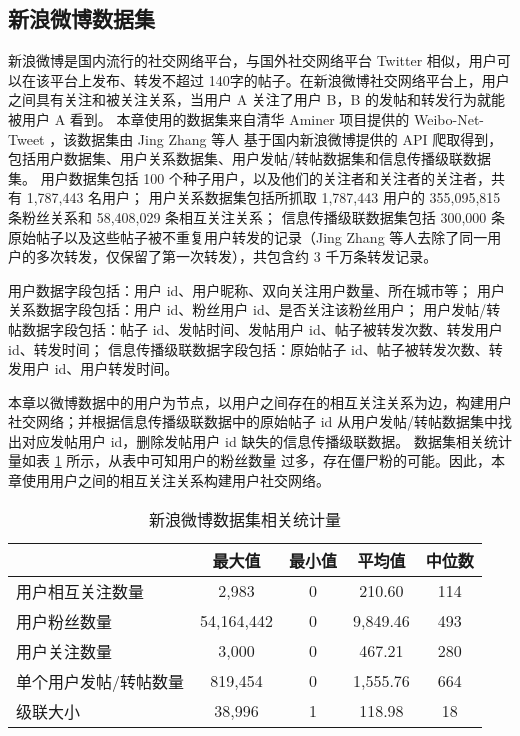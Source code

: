 \subsection{新浪微博数据集}
新浪微博是国内流行的社交网络平台，与国外社交网络平台 Twitter 相似，用户可以在该平台上发布、转发不超过 140字的帖子。在新浪微博社交网络平台上，用户之间具有关注和被关注关系，当用户 A 关注了用户 B，B 的发帖和转发行为就能被用户 A 看到。
本章使用的数据集来自清华 Aminer 项目提供的 Weibo-Net-Tweet \cite{weibodata}，该数据集由 Jing Zhang 等人 \cite{zhang2013social} 基于国内新浪微博提供的 API 爬取得到，包括用户数据集、用户关系数据集、用户发帖/转帖数据集和信息传播级联数据集。
用户数据集包括 100 个种子用户，以及他们的关注者和关注者的关注者，共有 1,787,443 名用户；
用户关系数据集包括所抓取 1,787,443 用户的 355,095,815 条粉丝关系和 58,408,029 条相互关注关系；
信息传播级联数据集包括 300,000 条原始帖子以及这些帖子被不重复用户转发的记录（Jing Zhang 等人去除了同一用户的多次转发，仅保留了第一次转发），共包含约 3 千万条转发记录。



用户数据字段包括：用户 id、用户昵称、双向关注用户数量、所在城市等；
用户关系数据字段包括：用户 id、粉丝用户 id、是否关注该粉丝用户；
用户发帖/转帖数据字段包括：帖子 id、发帖时间、发帖用户 id、帖子被转发次数、转发用户 id、转发时间；
信息传播级联数据字段包括：原始帖子 id、帖子被转发次数、转发用户 id、用户转发时间。


本章以微博数据中的用户为节点，以用户之间存在的相互关注关系为边，构建用户社交网络；并根据信息传播级联数据中的原始帖子 id 从用户发帖/转帖数据集中找出对应发帖用户 id，删除发帖用户 id 缺失的信息传播级联数据。
数据集相关统计量如表 \ref{tabana:weibo} 所示，从表中可知用户的粉丝数量 \cite{2020wujing} 过多，存在僵尸粉的可能。因此，本章使用用户之间的相互关注关系构建用户社交网络。


\begin{table}[]
	\begin{center}
		\caption{新浪微博数据集相关统计量}
		\begin{tabular}{lcccc}
			\toprule[1.5pt]
			 & 最大值 & 最小值 & 平均值 & 中位数\\
			\midrule[1pt]
			用户相互关注数量 & 2,983 & 0 & 210.60 & 114 \\
			用户粉丝数量 & 54,164,442 & 0 & 9,849.46 & 493 \\
			用户关注数量 & 3,000 & 0 & 467.21 & 280 \\
			单个用户发帖/转帖数量 & 819,454 & 0 & 1,555.76 & 664 \\
			级联大小 & 38,996 & 1 & 118.98 & 18 \\
			\bottomrule[1.5pt]
		\end{tabular}
		\label{tabana:weibo}
		\vspace{\baselineskip}
	\end{center}
\end{table}


